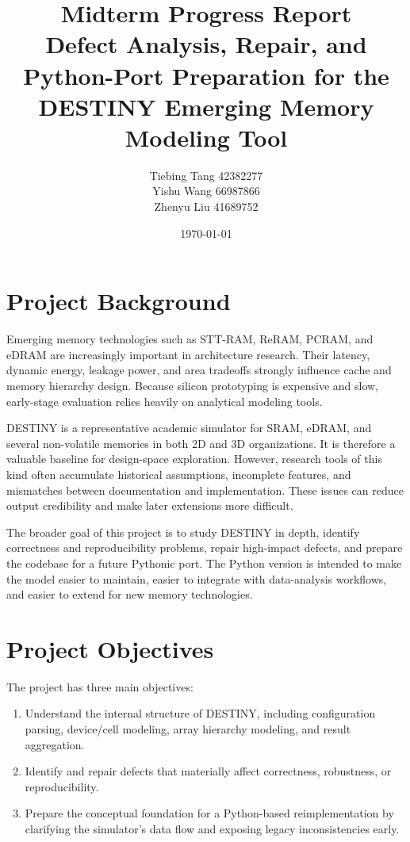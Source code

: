 \documentclass[11pt]{article}
\title{Midterm Progress Report\\[1em]
\large Defect Analysis, Repair, and Python-Port Preparation for the DESTINY Emerging Memory Modeling Tool}
\author{Tiebing Tang 42382277\\ \quad Yishu Wang 66987866 \\ \quad Zhenyu Liu 41689752}
\date{\today}
\begin{document}
\maketitle
\onehalfspacing

\section{Project Background}

Emerging memory technologies such as STT-RAM, ReRAM, PCRAM, and eDRAM are increasingly important in architecture research. Their latency, dynamic energy, leakage power, and area tradeoffs strongly influence cache and memory hierarchy design. Because silicon prototyping is expensive and slow, early-stage evaluation relies heavily on analytical modeling tools.

DESTINY is a representative academic simulator for SRAM, eDRAM, and several non-volatile memories in both 2D and 3D organizations. It is therefore a valuable baseline for design-space exploration. However, research tools of this kind often accumulate historical assumptions, incomplete features, and mismatches between documentation and implementation. These issues can reduce output credibility and make later extensions more difficult.

The broader goal of this project is to study DESTINY in depth, identify correctness and reproducibility problems, repair high-impact defects, and prepare the codebase for a future Pythonic port. The Python version is intended to make the model easier to maintain, easier to integrate with data-analysis workflows, and easier to extend for new memory technologies.

\section{Project Objectives}

The project has three main objectives:

\begin{enumerate}[leftmargin=1.5em]
    \item Understand the internal structure of DESTINY, including configuration parsing, device/cell modeling, array hierarchy modeling, and result aggregation.
    \item Identify and repair defects that materially affect correctness, robustness, or reproducibility.
    \item Prepare the conceptual foundation for a Python-based reimplementation by clarifying the simulator's data flow and exposing legacy inconsistencies early.
\end{enumerate}
\end{document}
